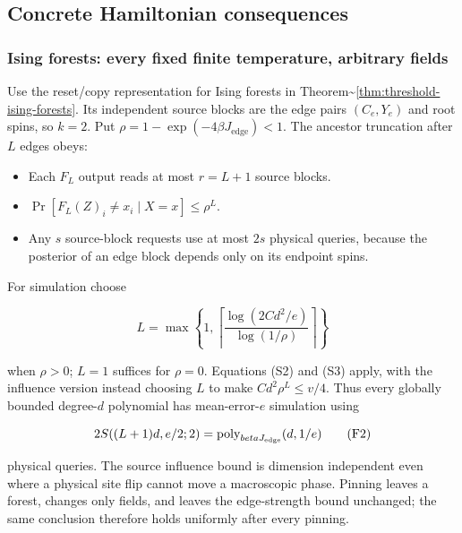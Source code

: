 \subsection{Concrete Hamiltonian
consequences}\label{influence-recovery:concrete-hamiltonian-consequences}

\subsubsection{Ising forests: every fixed finite temperature, arbitrary
fields}\label{influence-recovery:ising-forests-every-fixed-finite-temperature-arbitrary-fields}

Use the reset/copy representation for Ising forests in
Theorem\textasciitilde{}\ref{thm:threshold-ising-forests}. Its
independent source blocks are the edge pairs \((C_e,Y_e)\) and root
spins, so \(k=2\). Put \(\rho=1-\exp(-4\beta J_{\mathrm{edge}})<1\). The
ancestor truncation after \(L\) edges obeys:

\begin{itemize}
\tightlist
\item
  Each \(F_L\) output reads at most \(r=L+1\) source blocks.
\item
  \(\Pr[F_L(Z)_i\ne x_i\mid X=x]\le\rho^L\).
\item
  Any \(s\) source-block requests use at most \(2s\) physical queries,
  because the posterior of an edge block depends only on its endpoint
  spins.
\end{itemize}

For simulation choose

\[
 L=\max\left\{1,\left\lceil
 \frac{\log(2C d^2/e)}{\log(1/\rho)}\right\rceil\right\}
 \tag{F1}
\]

when \(\rho>0\); \(L=1\) suffices for \(\rho=0\). Equations (S2) and
(S3) apply, with the influence version instead choosing \(L\) to make
\(Cd^2\rho^L\le v/4\). Thus every globally bounded degree-\(d\)
polynomial has mean-error-\(e\) simulation using

\[
 2S((L+1)d,e/2;2)
 =\operatorname{poly}_{\beta J_{\rm edge}}(d,1/e)
 \tag{F2}
\]

physical queries. The source influence bound is dimension independent
even where a physical site flip cannot move a macroscopic phase. Pinning
leaves a forest, changes only fields, and leaves the edge-strength bound
unchanged; the same conclusion therefore holds uniformly after every
pinning.

